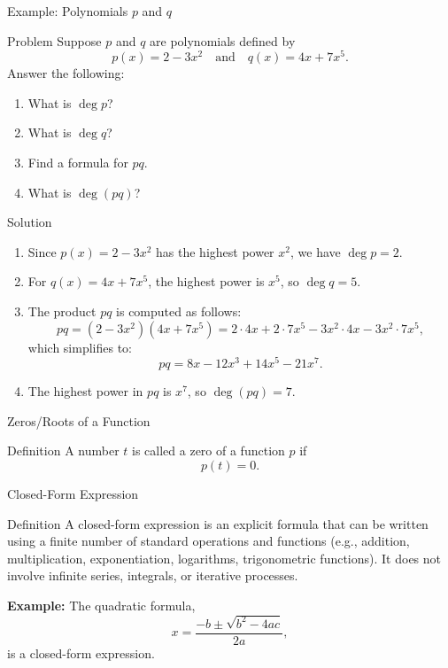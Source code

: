 \begin{frame}{Example: Polynomials \(p\) and \(q\)}
  \begin{exampleblock}{Problem}
  Suppose \(p\) and \(q\) are polynomials defined by
  \[
  p(x) = 2 - 3x^2 \quad \text{and} \quad q(x) = 4x + 7x^5.
  \]
  Answer the following:
  \begin{enumerate}
      \item What is \(\deg p\)?
      \item What is \(\deg q\)?
      \item Find a formula for \(pq\).
      \item What is \(\deg(pq)\)?
  \end{enumerate}
  \end{exampleblock}
\end{frame} 
\begin{frame}
  \begin{exampleblock}{Solution}
  \begin{enumerate}
      \item Since \(p(x) = 2 - 3x^2\) has the highest power \(x^2\), we have \(\deg p = 2\).
      \item For \(q(x) = 4x + 7x^5\), the highest power is \(x^5\), so \(\deg q = 5\).
      \item The product \(pq\) is computed as follows:
      \[
      pq = (2-3x^2)(4x+7x^5) = 2\cdot 4x + 2\cdot 7x^5 - 3x^2\cdot 4x - 3x^2\cdot 7x^5,
      \]
      which simplifies to:
      \[
      pq = 8x - 12x^3 + 14x^5 - 21x^7.
      \]
      \item The highest power in \(pq\) is \(x^7\), so \(\deg(pq) = 7\).
  \end{enumerate}
  \end{exampleblock}
  \end{frame}


  \begin{frame}{Zeros/Roots of a Function}
    \begin{block}{Definition}
      A number \(t\) is called a zero of a function \(p\) if
      \[
        p(t) = 0.
      \]
    \end{block}
  \end{frame}

  \begin{frame}{Closed-Form Expression}
    \begin{block}{Definition}
      A closed-form expression is an explicit formula that can be written using a finite number of standard operations and functions (e.g., addition, multiplication, exponentiation, logarithms, trigonometric functions). It does not involve infinite series, integrals, or iterative processes.
    \end{block}
    \vspace{0.5em}
    \textbf{Example:} The quadratic formula,
    \[
      x = \frac{-b \pm \sqrt{b^2-4ac}}{2a},
    \]
    is a closed-form expression.
  \end{frame}
  
